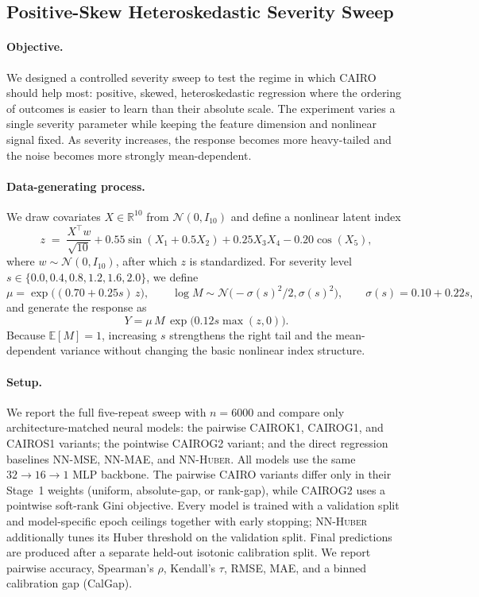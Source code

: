 \providecommand{\PositiveSkewFigureDir}{../results/benchmarks/positive_skew_study/figures}

\subsection{Positive-Skew Heteroskedastic Severity Sweep}
\label{sec:positive-skew}

\paragraph{Objective.}
We designed a controlled severity sweep to test the regime in which CAIRO should help most: positive, skewed, heteroskedastic regression where the ordering of outcomes is easier to learn than their absolute scale. The experiment varies a single severity parameter while keeping the feature dimension and nonlinear signal fixed. As severity increases, the response becomes more heavy-tailed and the noise becomes more strongly mean-dependent.

\paragraph{Data-generating process.}
We draw covariates $X \in \mathbb{R}^{10}$ from $\mathcal{N}(0,I_{10})$ and define a nonlinear latent index
\[
z \;=\; \frac{X^\top w}{\sqrt{10}}
+ 0.55 \sin(X_1 + 0.5 X_2)
+ 0.25 X_3 X_4
- 0.20 \cos(X_5),
\]
where $w \sim \mathcal{N}(0,I_{10})$, after which $z$ is standardized. For severity level $s \in \{0.0,0.4,0.8,1.2,1.6,2.0\}$, we define
\[
\mu = \exp\!\big((0.70 + 0.25s)\,z\big),
\qquad
\log M \sim \mathcal{N}\!\big(-\sigma(s)^2/2,\sigma(s)^2\big),
\qquad
\sigma(s)=0.10+0.22s,
\]
and generate the response as
\[
Y = \mu \, M \, \exp\!\big(0.12s\max(z,0)\big).
\]
Because $\mathbb{E}[M]=1$, increasing $s$ strengthens the right tail and the mean-dependent variance without changing the basic nonlinear index structure.

\paragraph{Setup.}
We report the full five-repeat sweep with $n=6000$ and compare only architecture-matched neural models: the pairwise \textsc{CAIROK1}, \textsc{CAIROG1}, and \textsc{CAIROS1} variants; the pointwise \textsc{CAIROG2} variant; and the direct regression baselines \textsc{NN-MSE}, \textsc{NN-MAE}, and \textsc{NN-Huber}. All models use the same $32 \rightarrow 16 \rightarrow 1$ MLP backbone. The pairwise CAIRO variants differ only in their Stage~1 weights (uniform, absolute-gap, or rank-gap), while \textsc{CAIROG2} uses a pointwise soft-rank Gini objective. Every model is trained with a validation split and model-specific epoch ceilings together with early stopping; \textsc{NN-Huber} additionally tunes its Huber threshold on the validation split. Final predictions are produced after a separate held-out isotonic calibration split. We report pairwise accuracy, Spearman's $\rho$, Kendall's $\tau$, RMSE, MAE, and a binned calibration gap (CalGap).


